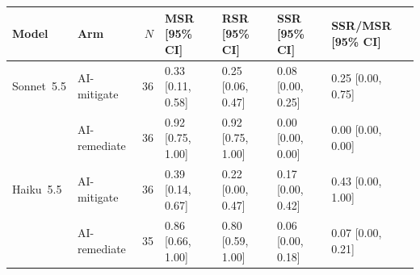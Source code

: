 \begin{tabular}{llrllll}
\toprule
Model & Arm & $N$ & MSR [95\% CI] & RSR [95\% CI] & SSR [95\% CI] & SSR/MSR [95\% CI] \\
\midrule
Sonnet~5.5 & AI-mitigate & 36 & 0.33 [0.11, 0.58] & 0.25 [0.06, 0.47] & 0.08 [0.00, 0.25] & 0.25 [0.00, 0.75] \\
 & AI-remediate & 36 & 0.92 [0.75, 1.00] & 0.92 [0.75, 1.00] & 0.00 [0.00, 0.00] & 0.00 [0.00, 0.00] \\
\midrule
Haiku~5.5 & AI-mitigate & 36 & 0.39 [0.14, 0.67] & 0.22 [0.00, 0.47] & 0.17 [0.00, 0.42] & 0.43 [0.00, 1.00] \\
 & AI-remediate & 35 & 0.86 [0.66, 1.00] & 0.80 [0.59, 1.00] & 0.06 [0.00, 0.18] & 0.07 [0.00, 0.21] \\
\bottomrule
\end{tabular}
